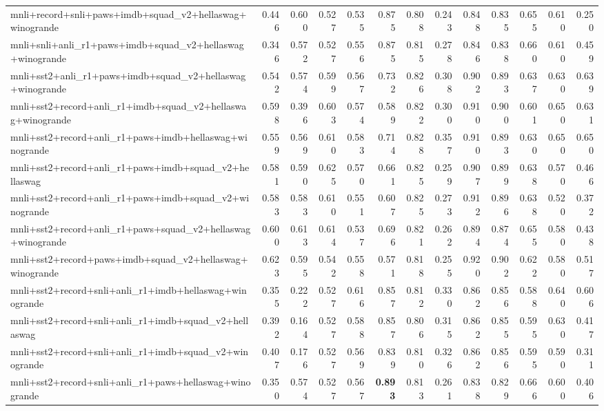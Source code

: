 \begin{table}[t]
\begin{tabular}{lrrrrrrrrrrrr}
    mnli+record+snli+paws+imdb+squad\_v2+hellaswag+winogrande & 0.446 & 0.600 & 0.527 & 0.535 & 0.875 & 0.808 & 0.243 & 0.848 & 0.835 & 0.655 & 0.610 & 0.250 \\
    mnli+snli+anli\_r1+paws+imdb+squad\_v2+hellaswag+winogrande & 0.346 & 0.572 & 0.527 & 0.556 & 0.875 & 0.815 & 0.278 & 0.846 & 0.838 & 0.660 & 0.610 & 0.459 \\
    mnli+sst2+anli\_r1+paws+imdb+squad\_v2+hellaswag+winogrande & 0.542 & 0.574 & 0.599 & 0.567 & 0.732 & 0.826 & 0.308 & 0.902 & 0.893 & 0.637 & 0.630 & 0.639 \\
    mnli+sst2+record+anli\_r1+imdb+squad\_v2+hellaswag+winogrande & 0.598 & 0.396 & 0.603 & 0.574 & 0.589 & 0.822 & 0.300 & 0.910 & 0.900 & 0.601 & 0.650 & 0.631 \\
    mnli+sst2+record+anli\_r1+paws+imdb+hellaswag+winogrande & 0.559 & 0.569 & 0.610 & 0.583 & 0.714 & 0.828 & 0.357 & 0.910 & 0.893 & 0.630 & 0.650 & 0.650 \\
    mnli+sst2+record+anli\_r1+paws+imdb+squad\_v2+hellaswag & 0.581 & 0.590 & 0.625 & 0.570 & 0.661 & 0.825 & 0.259 & 0.907 & 0.899 & 0.638 & 0.570 & 0.466 \\
    mnli+sst2+record+anli\_r1+paws+imdb+squad\_v2+winogrande & 0.583 & 0.583 & 0.610 & 0.551 & 0.607 & 0.825 & 0.273 & 0.912 & 0.896 & 0.638 & 0.520 & 0.372 \\
    mnli+sst2+record+anli\_r1+paws+squad\_v2+hellaswag+winogrande & 0.600 & 0.613 & 0.614 & 0.537 & 0.696 & 0.821 & 0.262 & 0.894 & 0.874 & 0.655 & 0.580 & 0.438 \\
    mnli+sst2+record+paws+imdb+squad\_v2+hellaswag+winogrande & 0.623 & 0.595 & 0.542 & 0.558 & 0.571 & 0.818 & 0.255 & 0.920 & 0.902 & 0.622 & 0.580 & 0.517 \\
    mnli+sst2+record+snli+anli\_r1+imdb+hellaswag+winogrande & 0.355 & 0.222 & 0.527 & 0.616 & 0.857 & 0.812 & 0.330 & 0.862 & 0.856 & 0.588 & 0.640 & 0.606 \\
    mnli+sst2+record+snli+anli\_r1+imdb+squad\_v2+hellaswag & 0.392 & 0.164 & 0.527 & 0.588 & 0.857 & 0.806 & 0.315 & 0.862 & 0.855 & 0.595 & 0.630 & 0.417 \\
    mnli+sst2+record+snli+anli\_r1+imdb+squad\_v2+winogrande & 0.407 & 0.176 & 0.527 & 0.569 & 0.839 & 0.810 & 0.326 & 0.862 & 0.856 & 0.595 & 0.590 & 0.311 \\
    mnli+sst2+record+snli+anli\_r1+paws+hellaswag+winogrande & 0.350 & 0.574 & 0.527 & 0.567 & \textbf{0.893} & 0.813 & 0.261 & 0.838 & 0.829 & 0.666 & 0.600 & 0.406 \\

\end{tabular}
\end{table}
